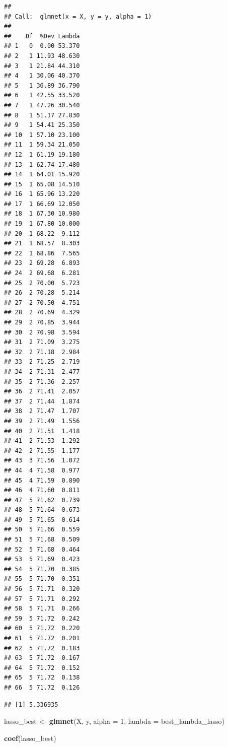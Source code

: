 \documentclass[
  12pt,
]{article}
\newenvironment{Shaded}{\begin{snugshade}}{\end{snugshade}}
\newcommand{\AttributeTok}[1]{\textcolor[rgb]{0.13,0.29,0.53}{#1}}
\newcommand{\DecValTok}[1]{\textcolor[rgb]{0.00,0.00,0.81}{#1}}
\newcommand{\FunctionTok}[1]{\textcolor[rgb]{0.13,0.29,0.53}{\textbf{#1}}}
\newcommand{\NormalTok}[1]{#1}
\newcommand{\OtherTok}[1]{\textcolor[rgb]{0.56,0.35,0.01}{#1}}
\newcommand{\SpecialCharTok}[1]{\textcolor[rgb]{0.81,0.36,0.00}{\textbf{#1}}}
\begin{document}
\begin{verbatim}
## 
## Call:  glmnet(x = X, y = y, alpha = 1) 
## 
##    Df  %Dev Lambda
## 1   0  0.00 53.370
## 2   1 11.93 48.630
## 3   1 21.84 44.310
## 4   1 30.06 40.370
## 5   1 36.89 36.790
## 6   1 42.55 33.520
## 7   1 47.26 30.540
## 8   1 51.17 27.830
## 9   1 54.41 25.350
## 10  1 57.10 23.100
## 11  1 59.34 21.050
## 12  1 61.19 19.180
## 13  1 62.74 17.480
## 14  1 64.01 15.920
## 15  1 65.08 14.510
## 16  1 65.96 13.220
## 17  1 66.69 12.050
## 18  1 67.30 10.980
## 19  1 67.80 10.000
## 20  1 68.22  9.112
## 21  1 68.57  8.303
## 22  1 68.86  7.565
## 23  2 69.28  6.893
## 24  2 69.68  6.281
## 25  2 70.00  5.723
## 26  2 70.28  5.214
## 27  2 70.50  4.751
## 28  2 70.69  4.329
## 29  2 70.85  3.944
## 30  2 70.98  3.594
## 31  2 71.09  3.275
## 32  2 71.18  2.984
## 33  2 71.25  2.719
## 34  2 71.31  2.477
## 35  2 71.36  2.257
## 36  2 71.41  2.057
## 37  2 71.44  1.874
## 38  2 71.47  1.707
## 39  2 71.49  1.556
## 40  2 71.51  1.418
## 41  2 71.53  1.292
## 42  2 71.55  1.177
## 43  3 71.56  1.072
## 44  4 71.58  0.977
## 45  4 71.59  0.890
## 46  4 71.60  0.811
## 47  5 71.62  0.739
## 48  5 71.64  0.673
## 49  5 71.65  0.614
## 50  5 71.66  0.559
## 51  5 71.68  0.509
## 52  5 71.68  0.464
## 53  5 71.69  0.423
## 54  5 71.70  0.385
## 55  5 71.70  0.351
## 56  5 71.71  0.320
## 57  5 71.71  0.292
## 58  5 71.71  0.266
## 59  5 71.72  0.242
## 60  5 71.72  0.220
## 61  5 71.72  0.201
## 62  5 71.72  0.183
## 63  5 71.72  0.167
## 64  5 71.72  0.152
## 65  5 71.72  0.138
## 66  5 71.72  0.126
\end{verbatim}

\begin{Shaded}
\end{Shaded}

\begin{verbatim}
## [1] 5.336935
\end{verbatim}

\begin{Shaded}
\begin{Highlighting}[]
\NormalTok{lasso\_best }\OtherTok{\textless{}{-}} \FunctionTok{glmnet}\NormalTok{(X, y, }\AttributeTok{alpha =} \DecValTok{1}\NormalTok{, }\AttributeTok{lambda =}\NormalTok{ best\_lambda\_lasso)}

\FunctionTok{coef}\NormalTok{(lasso\_best)}
\end{Highlighting}
\end{Shaded}
\end{document}

